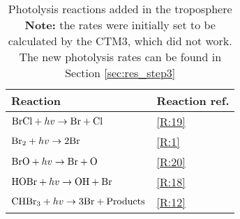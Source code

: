 \begin{table}[ht]
\centering
\begin{tabular}{|l|l|}
\hline
\textbf{Reaction}                                             & \textbf{Reaction ref.} \\ \hline
$\mathrm{BrCl} + hv \rightarrow \mathrm{Br} + \mathrm{Cl}$          & \ref{R:19}             \\
$\mathrm{Br_2} + hv \rightarrow 2\mathrm{Br}$                     & \ref{R:1}              \\
$\mathrm{BrO} + hv \rightarrow \mathrm{Br} + \mathrm{O}$                & \ref{R:20}             \\
$\mathrm{HOBr} + hv \rightarrow \mathrm{OH} + \mathrm{Br}$          & \ref{R:18}             \\
$\mathrm{CHBr_3} + hv \rightarrow 3\mathrm{Br} + \text{Products}$ & \ref{R:12}             \\ \hline
\end{tabular}
\caption{Photolysis reactions added in the troposphere \\ \textbf{Note:} the rates were initially set to be calculated by the CTM3, which did not work. The new photolysis rates can be found in Section \ref{sec:res_step3}}
\label{tab:photolysis_reactions}
\end{table}